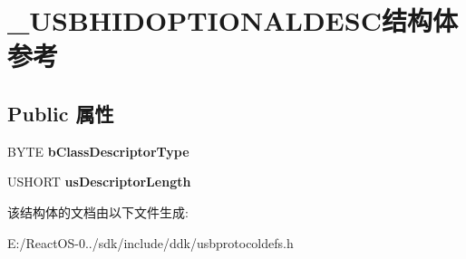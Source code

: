 \hypertarget{struct___u_s_b_h_i_d_o_p_t_i_o_n_a_l_d_e_s_c}{}\section{\+\_\+\+U\+S\+B\+H\+I\+D\+O\+P\+T\+I\+O\+N\+A\+L\+D\+E\+S\+C结构体 参考}
\label{struct___u_s_b_h_i_d_o_p_t_i_o_n_a_l_d_e_s_c}
\subsection*{Public 属性}
\begin{DoxyCompactItemize}
\item 
\mbox{\label{struct___u_s_b_h_i_d_o_p_t_i_o_n_a_l_d_e_s_c_a3c623aac699c860ee5bee7e32b719d8d}} 
B\+Y\+TE {\bfseries b\+Class\+Descriptor\+Type}
\item 
\mbox{\label{struct___u_s_b_h_i_d_o_p_t_i_o_n_a_l_d_e_s_c_a24cb77cdce057816441b5d36b7a6a5be}} 
U\+S\+H\+O\+RT {\bfseries us\+Descriptor\+Length}
\end{DoxyCompactItemize}


该结构体的文档由以下文件生成\+:\begin{DoxyCompactItemize}
\item 
E\+:/\+React\+O\+S-\/0../sdk/include/ddk/usbprotocoldefs.\+h\end{DoxyCompactItemize}
